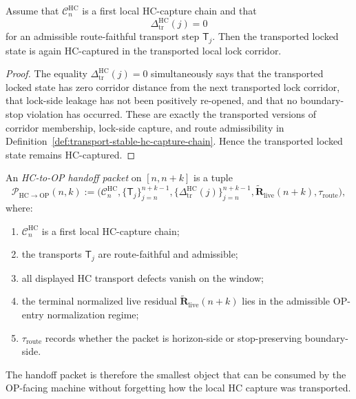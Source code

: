 \begin{lemma}
\label{lem:zero-hc-transport-defect-preserves-capture}
Assume that $\mathcal C_n^{\mathrm{HC}}$ is a first local HC-capture chain and that
\[
  \Delta_{\mathrm{tr}}^{\mathrm{HC}}(j)=0
\]
for an admissible route-faithful transport step $\mathsf T_j$.  Then the transported locked state is again HC-captured in the transported local lock corridor.
\end{lemma}

\begin{proof}
The equality $\Delta_{\mathrm{tr}}^{\mathrm{HC}}(j)=0$ simultaneously says that the transported locked state has zero corridor distance from the next transported lock corridor, that lock-side leakage has not been positively re-opened, and that no boundary-stop violation has occurred.  These are exactly the transported versions of corridor membership, lock-side capture, and route admissibility in Definition~\ref{def:transport-stable-hc-capture-chain}.  Hence the transported locked state remains HC-captured.
\end{proof}

\begin{definition}
\label{def:hc-to-op-handoff-packet}
An \emph{HC-to-OP handoff packet} on $[n,n+k]$ is a tuple
\[
  \mathcal P_{\mathrm{HC}\to\mathrm{OP}}(n,k)
  :=
  \bigl(
    \mathcal C_n^{\mathrm{HC}},
    \{\mathsf T_j\}_{j=n}^{n+k-1},
    \{\Delta_{\mathrm{tr}}^{\mathrm{HC}}(j)\}_{j=n}^{n+k-1},
    \widetilde{\mathbf R}_{\mathrm{live}}(n+k),
    \tau_{\mathrm{route}}
  \bigr),
\]
where:
\begin{enumerate}[leftmargin=2em,label=(\alph*)]
  \item $\mathcal C_n^{\mathrm{HC}}$ is a first local HC-capture chain;
  \item the transports $\mathsf T_j$ are route-faithful and admissible;
  \item all displayed HC transport defects vanish on the window;
  \item the terminal normalized live residual $\widetilde{\mathbf R}_{\mathrm{live}}(n+k)$ lies in the admissible OP-entry normalization regime;
  \item $\tau_{\mathrm{route}}$ records whether the packet is horizon-side or stop-preserving boundary-side.
\end{enumerate}
The handoff packet is therefore the smallest object that can be consumed by the OP-facing machine without forgetting how the local HC capture was transported.
\end{definition}

